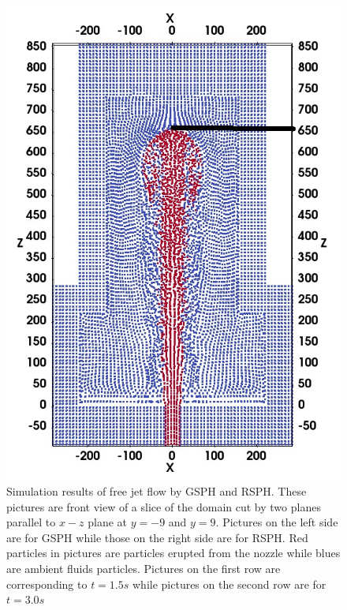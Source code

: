 \begin{figure}[H]
\begin{minipage}[t]{.325\textwidth}
        \includegraphics[width=0.99 \textwidth]{./Figures/RSPH-t3-cutView}
    \end{minipage}%
    \caption{Simulation results of free jet flow by GSPH and RSPH. These pictures are front view of a slice of the domain cut by two planes parallel to $x-z$ plane at $y=-9$ and $y=9$. Pictures on the left side are for GSPH while those on the right side are for RSPH. Red particles in pictures are particles erupted from the nozzle while blues are ambient fluids particles. Pictures on the first row are corresponding to $t=1.5s$ while pictures on the second row are for $t=3.0 s$}
    \label{fig:free-jet-comparison}
\end{figure}

